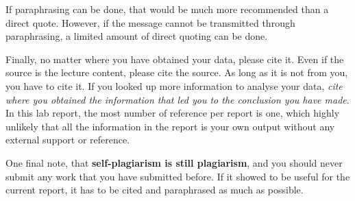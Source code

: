 If paraphrasing can be done, that would be much more recommended than a direct quote. However, if the message cannot be transmitted through paraphrasing, a limited amount of direct quoting can be done. 

Finally, no matter where you have obtained your data, please cite it. Even if the source is the lecture content, please cite the source. As long as it is not from you, you have to cite it. If you looked up more information to analyse your data, \textit{cite where you obtained the information that led you to the conclusion you have made}. In this lab report, the most number of reference per report is one, which highly unlikely that all the information in the report is your own output without any external support or reference. 

One final note, that \textbf{self-plagiarism is still plagiarism}, and you should never submit any work that you have submitted before. If it showed to be useful for the current report, it has to be cited and paraphrased as much as possible. 
